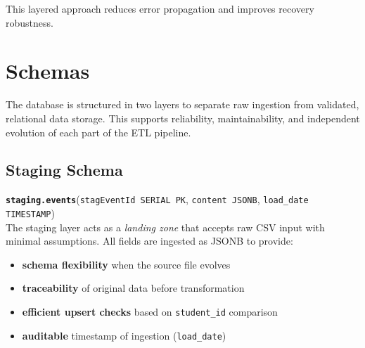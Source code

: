 \documentclass[11pt]{article}
\begin{document}
This layered approach reduces error propagation and improves recovery robustness.

\begin{center}
\end{center}

\label{fig:etl_arch}


\section{Schemas}

The database is structured in two layers to separate raw ingestion from validated, relational data storage. This supports reliability, maintainability, and independent evolution of each part of the ETL pipeline.

\subsection*{Staging Schema}

\textbf{\texttt{staging.events}}(\texttt{stagEventId SERIAL PK}, \texttt{content JSONB}, \texttt{load\_date TIMESTAMP})\\[3pt]
The staging layer acts as a \textit{landing zone} that accepts raw CSV input with minimal assumptions. All fields are ingested as JSONB to provide:

\begin{itemize}
\item \textbf{schema flexibility} when the source file evolves
\item \textbf{traceability} of original data before transformation
\item \textbf{efficient upsert checks} based on \texttt{student\_id} comparison
\item \textbf{auditable} timestamp of ingestion (\texttt{load\_date})
\end{itemize}
\end{document}
